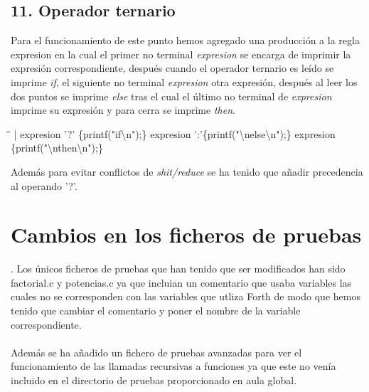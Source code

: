 \documentclass[11pt,spanish]{article}
\begin{document}
		\subsection*{11. Operador ternario}
		Para el funcionamiento de este punto hemos agregado una producción a la regla {\ttfamily expresion} en la cual el primer no terminal \textit {expresion} se encarga de imprimir la expresión correspondiente, después cuando el operador ternario es leído se imprime \textit {if}, el siguiente no terminal \textit {expresion} otra expresión, después al leer los dos puntos se imprime \textit {else} tras el cual el último no terminal de \textit {expresion} imprime su expresión y para cerra se imprime \textit {then}.
		\begin{tabbing}
            \hspace*{1cm}\=\hspace*{1cm}\= \hspace*{6cm}\=\kill
			| expresion '?' \{printf("if\textbackslash n");\} expresion ':'\{printf("\textbackslash nelse\textbackslash n");\} expresion \{printf("\textbackslash nthen\textbackslash n");\}
			
		\end{tabbing}
		Además para evitar conflictos de \textit {shit/reduce} se ha tenido que añadir precedencia al operando '?'.
	\section{Cambios en los ficheros de pruebas}.
	Los únicos ficheros de pruebas que han tenido que ser modificados han sido factorial.c y potencias.c ya que incluian un comentario que usaba variables las cuales no se corresponden con las variables que utliza Forth de modo que hemos tenido que cambiar el comentario y poner el nombre de la variable correspondiente.\\ \\
	Además se ha añadido un fichero de pruebas avanzadas para ver el funcionamiento de las llamadas recursivas a funciones ya que este no venía incluido en el directorio de pruebas proporcionado en aula global.
\end{document}
